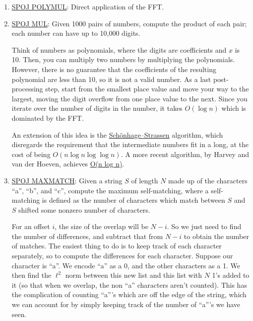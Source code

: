\documentclass[11pt, oneside]{article}
\theoremstyle{plain}
\theoremstyle{definition}
\begin{document}
\begin{enumerate}
  \item \href{https://www.spoj.com/problems/POLYMUL/}{SPOJ POLYMUL}:
    Direct application of the FFT.

  \item \href{https://www.spoj.com/problems/MUL/}{SPOJ MUL}:
    Given 1000 pairs of numbers, compute the product of each pair;
    each number can have up to 10,000 digits.

    Think of numbers as polynomials, where the digits are coefficients and
    \( x \) is 10. Then, you can multiply two numbers by multiplying the
    polynomials. However, there is no guarantee that the coefficients
    of the resulting polynomial are less than 10, so it is not a valid number.
    As a last post-processing step, start from the smallest place value
    and move your way to the largest, moving the digit overflow from one place
    value to the next. Since you iterate over the number of digits in the
    number, it takes \( O(\log n) \) which is dominated by the FFT.
    
    An extension of this idea is the 
    \href{https://en.wikipedia.org/wiki/Sch%C3%B6nhage%E2%80%93Strassen_algorithm}
    {Schönhage–Strassen} algorithm, which disregards the requirement
    that the intermediate numbers fit in a long, at the cost of being
    \( O(n \log n \log \log n) \). A more recent algorithm,
    by Harvey and van der Hoeven, achieves 
    \href{https://hal.archives-ouvertes.fr/hal-02070778/document}{O(n log n)}.

  \item \href{https://www.spoj.com/problems/MAXMATCH/}{SPOJ MAXMATCH}:
    Given a string \( S \) of length \( N \) made up of the characters
    \enquote{a}, \enquote{b}, and \enquote{c}, compute the maximum
    self-matching, where a self-matching is defined as the number of characters
    which match between \( S \) and \( S \) shifted some
    nonzero number of characters.

    For an offset \( i \), the size of the overlap will be \( N - i \).
    So we just need to find the number of differences, and subtract that
    from \( N - i \) to obtain the number of matches.
    The easiest thing to do is to keep track of each character separately,
    so to compute the differences for each character.
    Suppose our character is \enquote{a}. We encode \enquote{a} as a 0,
    and the other characters as a 1. We then find the \( \ell^2 \) norm between 
    this new list and this list with \( N \) 1's added to it
    (so that when we overlap, the non \enquote{a} characters aren't counted).
    This has the complication of counting \enquote{a}'s which are off the edge
    of the string, which we can account for by simply keeping track of the 
    number of \enquote{a}'s we have seen.


\end{enumerate}
\end{document}
